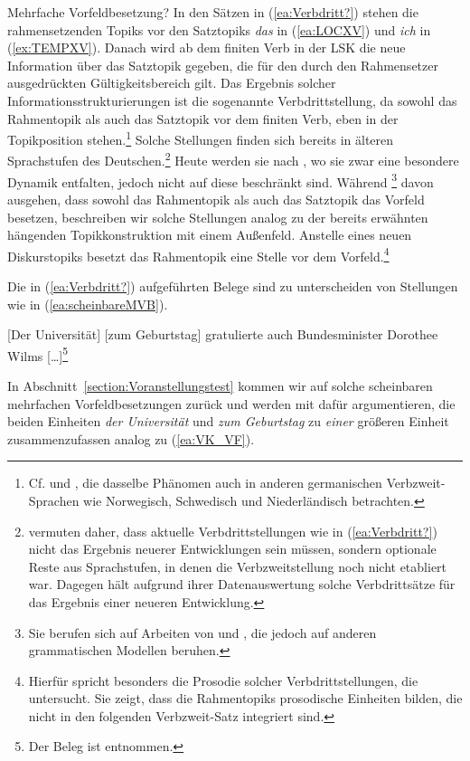 \begin{Exkurs}{Mehrfache Vorfeldbesetzung?}
In den Sätzen in (\ref{ea:Verbdritt?}) stehen die rahmensetzenden Topiks vor den Satztopiks \textit{das} in (\ref{ea:LOCXV}) und \textit{ich} in (\ref{ex:TEMPXV}). Danach wird ab dem finiten Verb in der LSK die neue Information über das Satztopik gegeben, die für den durch den Rahmensetzer ausgedrückten Gültigkeitsbereich gilt. Das Ergebnis solcher Informationsstrukturierungen ist die sogenannte Verbdrittstellung, da sowohl das Rahmentopik als auch das Satztopik vor dem finiten Verb, eben in der Topikposition stehen.\footnote{Cf. \citet[19--24]{Schalowski2017} und \citet[88--91]{Freywald_al_2015}, die dasselbe Phänomen auch in anderen germanischen Verbzweit-Sprachen wie Norwegisch, Schwedisch und Niederländisch betrachten.} Solche Stellungen finden sich bereits in älteren Sprachstufen des Deutschen.\footnote{\citet[235]{Demske_Wiese2016} vermuten daher, dass aktuelle Verbdrittstellungen wie in (\ref{ea:Verbdritt?}) nicht das Ergebnis neuerer Entwicklungen sein müssen, sondern optionale Reste aus Sprachstufen, in denen die Verbzweitstellung noch nicht etabliert war. Dagegen hält  \citet[35--37]{Breitbarth2023} aufgrund ihrer Datenauswertung solche Verbdrittsätze für das Ergebnis einer neueren Entwicklung.} Heute werden sie nach \citet[167]{Freywald_al_2023} , wo sie zwar eine besondere Dynamik entfalten, jedoch nicht auf diese beschränkt sind. Während \citet[166]{Freywald_al_2023}\footnote{Sie berufen sich auf Arbeiten von \citet{Walkden2017} und \citet{Bunk2020}, die jedoch auf anderen grammatischen Modellen beruhen.} davon ausgehen, dass sowohl das Rahmentopik als auch das Satztopik das Vorfeld besetzen, beschreiben wir solche Stellungen analog zu der bereits erwähnten hängenden Topikkonstruktion mit einem Außenfeld. Anstelle eines neuen Diskurstopiks besetzt das Rahmentopik eine Stelle vor dem Vorfeld.\footnote{Hierfür spricht besonders die Prosodie solcher Verbdrittstellungen, die \citet{Breitbarth2022} untersucht. Sie zeigt, dass die Rahmentopiks prosodische Einheiten bilden, die nicht in den folgenden Verbzweit-Satz integriert sind.} 

Die in (\ref{ea:Verbdritt?}) aufgeführten Belege sind zu unterscheiden von Stellungen wie in (\ref{ea:scheinbareMVB}).

\ea \label{ea:scheinbareMVB} [Der Universität] [zum Geburtstag] gratulierte auch Bundesminister Dorothee Wilms [\ldots]\footnote{Der Beleg ist \citet[87]{Duerscheid1989} entnommen.}  
\z 

In Abschnitt~\ref{section:Voranstellungstest} kommen wir auf solche scheinbaren mehrfachen Vorfeldbesetzungen zurück und werden mit \citet{Mueller2005} dafür argumentieren, die beiden Einheiten \textit{der Universität} und \textit{zum Geburtstag} zu \textit{einer} größeren Einheit zusammenzufassen analog zu (\ref{ea:VK_VF}).


\end{Exkurs}
